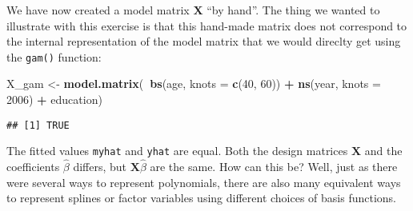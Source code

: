 \documentclass[]{article}
\newenvironment{Shaded}{\begin{snugshade}}{\end{snugshade}}
\newcommand{\KeywordTok}[1]{\textcolor[rgb]{0.13,0.29,0.53}{\textbf{#1}}}
\newcommand{\DataTypeTok}[1]{\textcolor[rgb]{0.13,0.29,0.53}{#1}}
\newcommand{\DecValTok}[1]{\textcolor[rgb]{0.00,0.00,0.81}{#1}}
\newcommand{\StringTok}[1]{\textcolor[rgb]{0.31,0.60,0.02}{#1}}
\newcommand{\CommentTok}[1]{\textcolor[rgb]{0.56,0.35,0.01}{\textit{#1}}}
\newcommand{\OperatorTok}[1]{\textcolor[rgb]{0.81,0.36,0.00}{\textbf{#1}}}
\newcommand{\NormalTok}[1]{#1}
\begin{document}
We have now created a model matrix \(\mathbf X\) ``by hand''. The thing
we wanted to illustrate with this exercise is that this hand-made matrix
does not correspond to the internal representation of the model matrix
that we would direclty get using the \texttt{gam()} function:

\begin{Shaded}
\begin{Highlighting}[]
\NormalTok{X_gam <-}\StringTok{ }\KeywordTok{model.matrix}\NormalTok{(}\OperatorTok{~}\KeywordTok{bs}\NormalTok{(age, }\DataTypeTok{knots =} \KeywordTok{c}\NormalTok{(}\DecValTok{40}\NormalTok{, }\DecValTok{60}\NormalTok{)) }\OperatorTok{+}\StringTok{ }\KeywordTok{ns}\NormalTok{(year, }\DataTypeTok{knots =} \DecValTok{2006}\NormalTok{) }\OperatorTok{+}\StringTok{ }
\StringTok{    }\NormalTok{education)}
\end{Highlighting}
\end{Shaded}

\begin{Shaded}
\end{Shaded}

\begin{verbatim}
## [1] TRUE
\end{verbatim}

The fitted values \texttt{myhat} and \texttt{yhat} are equal. Both the
design matrices \(\mathbf X\) and the coefficients \(\hat{\beta}\)
differs, but \(\mathbf X \hat{\beta}\) are the same. How can this be?
Well, just as there were several ways to represent polynomials, there
are also many equivalent ways to represent splines or factor variables
using different choices of basis functions.
\end{document}
